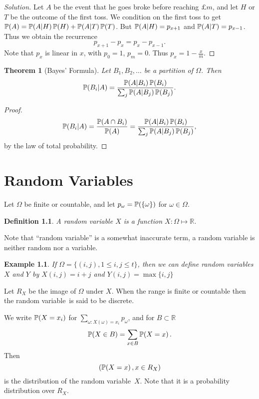 \documentclass{notes}
\theoremstyle{plain}
\newtheorem{theorem}{Theorem}[chapter]
\newtheorem*{example}{Example}
\newtheorem{definition}{Definition}[chapter]
\newcommand{\bP}{\mathbb{P}}
\newcommand{\bR}{\mathbb{R}}
\newcommand{\prob}[1]{\bP \negthinspace\left(#1\right)}
\newcommand{\rv}{random variable\ }
\begin{document}
\begin{proof}[Solution]
Let $A$ be the event that he goes broke before reaching $\pounds m$, and
let $H$ or $T$ be the outcome of the first toss.  We condition on the first
toss to get $\prob{A} = \prob{A | H} \prob{H} + \prob{A | T} \prob{T}$.  But
$\prob{A | H} = p_{x+1}$ and $\prob{A | T} = p_{x-1}$.  Thus we obtain the
recurrence
\[
p_{x+1} - p_x = p_x - p_{x-1}.
\]
Note that $p_x$ is linear in $x$, with $p_0 = 1$, $p_m = 0$.  Thus
$p_x = 1 - \tfrac{x}{m}$.
\end{proof}

\begin{theorem}[Bayes' Formula]
Let $B_1, B_2, \dots$ be a partition of $\Omega$.  Then
\[
\prob{B_i | A} = \frac{\prob{A | B_i} \prob{B_i}}{\sum_j \prob{A | B_j} 
\prob{B_j}}.
\]
\end{theorem}

\begin{proof}
\[
\prob{B_i | A} = \frac{\prob{A \cap B_i}}{\prob{A}}
= \frac{\prob{A | B_i} \prob{B_i}}{\sum_j \prob{A | B_j} \prob{B_j}},
\]
by the law of total probability.
\end{proof}

\chapter{Random Variables}

Let $\Omega$ be finite or countable, and let $p_\omega = \prob{\{ \omega \}}$
for $\omega \in \Omega$.

\begin{definition}
A random variable $X$ is a function $X : \Omega \mapsto \bR$.
\end{definition}

Note that ``random variable'' is a somewhat inaccurate term, a random
variable is neither random nor a variable.

\begin{example}
If $\Omega = \{ (i,j), 1 \le i,j \le t \}$, then we can define random
variables $X$ and $Y$ by $X(i,j) = i+j$ and $Y(i,j) = \max \{ i,j \}$
\end{example}

Let $R_X$ be the image of $\Omega$ under $X$.  When the range is finite
or countable then the \rv is said to be discrete.

We write $\prob{X = x_i}$ for $\sum_{\omega : X(\omega) = x_i} p_\omega$,
and for $B \subset \bR$
\[
\prob{X \in B} = \sum_{x \in B}  \prob{X = x}.
\]
Then
\[
(\prob{X = x}, x \in R_X)
\]
is the distribution of the \rv $X$.  Note that it is a probability
distribution over $R_X$.
\end{document}
